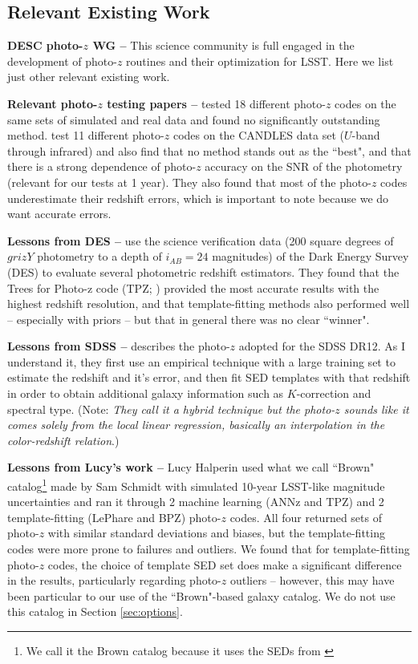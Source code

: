 \documentclass[DM,lsstdraft,toc]{lsstdoc}
\begin{document}
\subsection{Relevant Existing Work}\label{ssec:options_lit}

\textbf{DESC photo-$z$ WG --} This science community is full engaged in the development of photo-$z$ routines and their optimization for LSST. Here we list just other relevant existing work.

\textbf{Relevant photo-$z$ testing papers --} \cite{2010A&A...523A..31H} tested 18 different photo-$z$ codes on the same sets of simulated and real data and found no significantly outstanding method. \cite{2013ApJ...775...93D} test 11 different photo-$z$ codes on the CANDLES data set ($U$-band through infrared) and also find that no method stands out as the ``best", and that there is a strong dependence of photo-$z$ accuracy on the SNR of the photometry (relevant for our tests at 1 year). They also found that most of the photo-$z$ codes underestimate their redshift errors, which is important to note because we do want accurate errors.

\textbf{Lessons from DES --} \cite{2014MNRAS.445.1482S} use the science verification data (200 square degrees of $grizY$ photometry to a depth of $i_{AB}=24$ magnitudes) of the Dark Energy Survey (DES) to evaluate several photometric redshift estimators. They found that the Trees for Photo-z code (TPZ; \citealt{2013ascl.soft04011C}) provided the most accurate results with the highest redshift resolution, and that template-fitting methods also performed well -- especially with priors -- but that in general there was no clear ``winner".

\textbf{Lessons from SDSS --} \cite{2016MNRAS.460.1371B} describes the photo-$z$ adopted for the SDSS DR12. As I understand it, they first use an empirical technique with a large training set to estimate the redshift and it's error, and then fit SED templates with that redshift in order to obtain additional galaxy information such as $K$-correction and spectral type. (Note: {\it They call it a hybrid technique but the photo-$z$ sounds like it comes solely from the local linear regression, basically an interpolation in the color-redshift relation}.)

\textbf{Lessons from Lucy's work --} Lucy Halperin used what we call ``Brown" catalog\footnote{We call it the Brown catalog because it uses the SEDs from \cite{2014ApJS..212...18B}} made by Sam Schmidt with simulated 10-year LSST-like magnitude uncertainties and ran it through 2 machine learning (ANNz and TPZ) and 2 template-fitting (LePhare and BPZ) photo-$z$ codes. All four returned sets of photo-$z$ with similar standard deviations and biases, but the template-fitting codes were more prone to failures and outliers. We found that for template-fitting photo-$z$ codes, the choice of template SED set does make a significant difference in the results, particularly regarding photo-$z$ outliers -- however, this may have been particular to our use of the ``Brown"-based galaxy catalog. We do not use this catalog in Section \ref{sec:options}.
\end{document}
